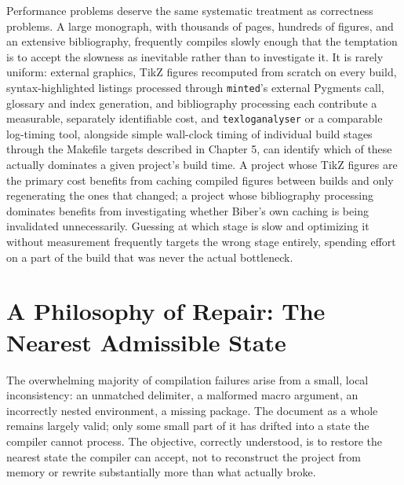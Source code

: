 Performance problems deserve the same systematic treatment as correctness problems. A large monograph, with thousands of pages, hundreds of figures, and an extensive bibliography, frequently compiles slowly enough that the temptation is to accept the slowness as inevitable rather than to investigate it. It is rarely uniform: external graphics, TikZ figures recomputed from scratch on every build, syntax-highlighted listings processed through \texttt{minted}'s external Pygments call, glossary and index generation, and bibliography processing each contribute a measurable, separately identifiable cost, and \texttt{texloganalyser} or a comparable log-timing tool, alongside simple wall-clock timing of individual build stages through the Makefile targets described in Chapter 5, can identify which of these actually dominates a given project's build time. A project whose TikZ figures are the primary cost benefits from caching compiled figures between builds and only regenerating the ones that changed; a project whose bibliography processing dominates benefits from investigating whether Biber's own caching is being invalidated unnecessarily. Guessing at which stage is slow and optimizing it without measurement frequently targets the wrong stage entirely, spending effort on a part of the build that was never the actual bottleneck.

\hypertarget{a-philosophy-of-repair-the-nearest-admissible-state}{%
\section{A Philosophy of Repair: The Nearest Admissible State}\label{a-philosophy-of-repair-the-nearest-admissible-state}}

The overwhelming majority of compilation failures arise from a small, local inconsistency: an unmatched delimiter, a malformed macro argument, an incorrectly nested environment, a missing package. The document as a whole remains largely valid; only some small part of it has drifted into a state the compiler cannot process. The objective, correctly understood, is to restore the nearest state the compiler can accept, not to reconstruct the project from memory or rewrite substantially more than what actually broke.


